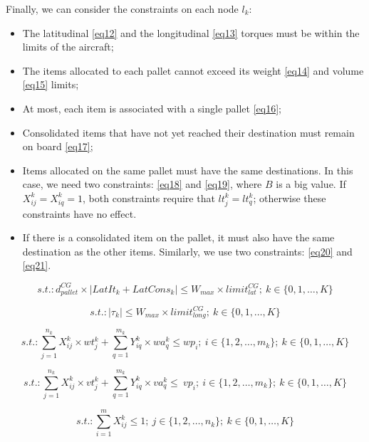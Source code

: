 \documentclass[preprint]{elsarticle}
\begin{document}
Finally, we can consider the constraints on each node $l_k$:

\begin{itemize}
	\item The latitudinal \ref{eq12} and the longitudinal \ref{eq13} torques must be within the limits of the aircraft;
	\item The items allocated to each pallet cannot exceed its weight \ref{eq14} and volume \ref{eq15} limits;
	\item At most, each item is associated with a single pallet \ref{eq16};
	\item Consolidated items that have not yet reached their destination must remain on board \ref{eq17};
	\item Items allocated on the same pallet must have the same destinations. In this case, we need two constraints: \ref{eq18} and \ref{eq19}, where $B$\/ is a big value. If $X_{ij}^k = X_{iq}^k = 1$, both constraints require that $lt_j^k = lt_q^k$; otherwise these constraints have no effect.
	\item If there is a consolidated item on the pallet, it must also have the same destination as the other items. Similarly, we use two constraints: \ref{eq20} and \ref{eq21}.
\end{itemize}

\begin{equation} \label{eq12}
	s.t.: d^{CG}_{pallet} \times | LatIt_k + LatCons_k | \leq  W_{max} \times limit^{CG}_{lat}; \ k \in \{0, 1, \ldots, K\}
\end{equation}

\begin{equation} \label{eq13}
	s.t.: |\tau_k| \leq W_{max} \times limit^{CG}_{long};\ k \in \{0, 1, \ldots, K\}
\end{equation}

\begin{equation} \label{eq14}
	s.t.: \sum_{j=1}^{n_k} X_{ij}^k \times wt_j^k + \sum_{q=1}^{m_k} Y_{iq}^k \times wa_q^k  \leq wp_i; \ i \in \{1, 2, \ldots, m_k\}; \ k \in \{0, 1, \ldots, K\}
\end{equation}

\begin{equation} \label{eq15}
	s.t.: \sum_{j=1}^{n_k} X_{ij}^k \times vt_j^k + \sum_{q=1}^{m_k} Y_{iq}^k \times va_q^k  \leq\ vp_i; \ i \in \{1, 2, \ldots, m_k\}; \ k \in \{0, 1, \ldots, K\}
\end{equation}

\begin{equation} \label{eq16}
	s.t.: \sum_{i=1}^{m} X_{ij}^k \leq 1; \ j \in \{1, 2, \ldots, n_k\}; \ k \in \{0, 1, \ldots, K\}
\end{equation}
\end{document}
